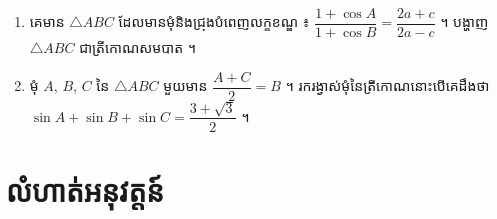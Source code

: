 \begin{enumerate}[1]
\begin{tasks}
    \task $\begin{cases} \frac{1 - \tan x}{1 + \tan x} = \tan y\\ x - y = \frac{\pi}{6} \end{cases}$ ។
  \end{tasks}
  \item គេមាន $\triangle ABC$ ដែលមានមុំនិងជ្រុងបំពេញលក្ខខណ្ឌ ៖ $\dfrac{1 + \cos A}{1 + \cos B} = \dfrac{2a + c}{2a - c}$ ។ បង្ហាញ $\triangle ABC$ ជាត្រីកោណសមបាត ។
  \item មុំ $A$, $B$, $C$ នៃ $\triangle ABC$ មួយមាន $\dfrac{A + C}{2} = B$ ។ រករង្វាស់មុំនៃត្រីកោណនោះបើគេដឹងថា $\sin A + \sin B + \sin C = \dfrac{3 + \sqrt{3}}{2}$ ។
\end{enumerate}

\section*{លំហាត់អនុវត្តន៍}
